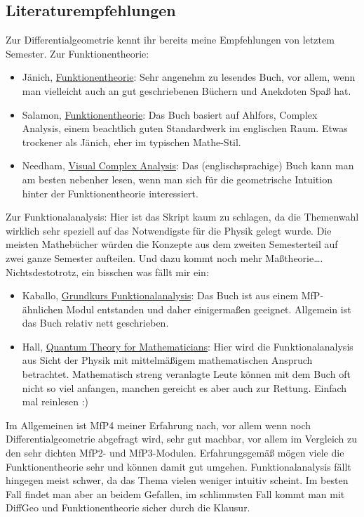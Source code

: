 \subsection{Literaturempfehlungen}
Zur Differentialgeometrie kennt ihr bereits meine Empfehlungen von letztem Semester.
Zur Funktionentheorie:
\begin{itemize}
\item Jänich, \href{https://link.springer.com/book/10.1007/3-540-35015-2}{Funktionentheorie}: Sehr angenehm zu lesendes Buch, vor allem, wenn man vielleicht auch an gut geschriebenen Büchern und Anekdoten Spaß hat. 
\item Salamon, \href{https://link.springer.com/book/10.1007/978-3-0348-0169-0}{Funktionentheorie}: Das Buch basiert auf Ahlfors, Complex Analysis, einem beachtlich guten Standardwerk im englischen Raum. Etwas trockener als Jänich, eher im typischen Mathe-Stil.
\item Needham, \href{https://umv.science.upjs.sk/hutnik/NeedhamVCA.pdf}{Visual Complex Analysis}: Das (englischsprachige) Buch kann man am besten nebenher lesen, wenn man sich für die geometrische Intuition hinter der Funktionentheorie interessiert.
\end{itemize}
Zur Funktionalanalysis:
Hier ist das Skript kaum zu schlagen, da die Themenwahl wirklich sehr speziell auf das Notwendigste für die Physik gelegt wurde. Die meisten Mathebücher würden die Konzepte aus dem zweiten Semesterteil auf zwei ganze Semester aufteilen. Und dazu kommt noch mehr Maßtheorie\dots. Nichtsdestotrotz, ein bisschen was fällt mir ein:
\begin{itemize}
\item Kaballo, \href{https://link.springer.com/book/10.1007/978-3-662-54748-9}{Grundkurs Funktionalanalysis}: Das Buch ist aus einem MfP-ähnlichen Modul entstanden und daher einigermaßen geeignet. Allgemein ist das Buch relativ nett geschrieben.
\item Hall, \href{https://link.springer.com/book/10.1007/978-1-4614-7116-5}{Quantum Theory for Mathematicians}: Hier wird die Funktionalanalysis aus Sicht der Physik mit mittelmäßigem mathematischen Anspruch betrachtet. Mathematisch streng veranlagte Leute können mit dem Buch oft nicht so viel anfangen, manchen gereicht es aber auch zur Rettung. Einfach mal reinlesen :)
\end{itemize}
Im Allgemeinen ist MfP4 meiner Erfahrung nach, vor allem wenn noch Differentialgeometrie abgefragt wird, sehr gut machbar, vor allem im Vergleich zu den sehr dichten MfP2- und MfP3-Modulen. Erfahrungsgemäß mögen viele die Funktionentheorie sehr und können damit gut umgehen. Funktionalanalysis fällt hingegen meist schwer, da das Thema vielen weniger intuitiv scheint. Im besten Fall findet man aber an beidem Gefallen, im schlimmsten Fall kommt man mit DiffGeo und Funktionentheorie sicher durch die Klausur.

